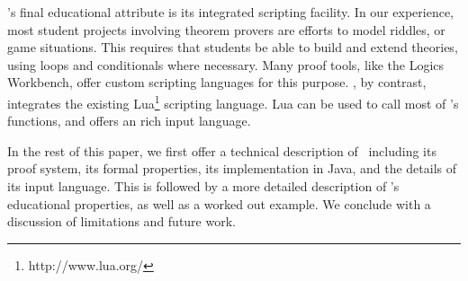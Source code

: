  \oops\/'s final educational attribute is its integrated scripting facility. In our experience, most student projects involving theorem provers are efforts to model riddles, or game situations. This requires that students be able to build and extend theories, using loops and conditionals where necessary. Many proof tools, like the Logics Workbench, offer custom scripting languages for this purpose. \oops\/, by contrast, integrates the existing Lua\footnote{http://www.lua.org/} scripting language. Lua can be used to call most of \oops\/'s functions, and offers an  rich input language.
 
In the rest of this paper, we first offer a technical description of \oops\, including its proof system, its formal properties, its implementation in Java, and the details of its input language. This is followed by a more detailed description of \oops\/'s educational properties, as well as a worked out example. We conclude with a discussion of limitations and future work.